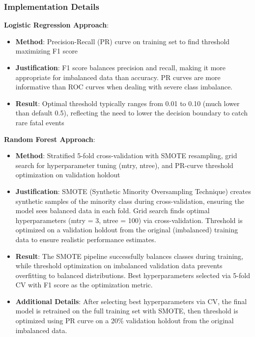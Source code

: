 \documentclass[12pt,a4paper]{article}
\begin{document}
\subsubsection{Implementation Details}

\textbf{Logistic Regression Approach}:
\begin{itemize}
    \item \textbf{Method}: Precision-Recall (PR) curve on training set to find threshold maximizing F1 score
    \item \textbf{Justification}: F1 score balances precision and recall, making it more appropriate for imbalanced data than accuracy. PR curves are more informative than ROC curves when dealing with severe class imbalance.
    \item \textbf{Result}: Optimal threshold typically ranges from 0.01 to 0.10 (much lower than default 0.5), reflecting the need to lower the decision boundary to catch rare fatal events
\end{itemize}

\textbf{Random Forest Approach}:
\begin{itemize}
    \item \textbf{Method}: Stratified 5-fold cross-validation with SMOTE resampling, grid search for hyperparameter tuning (mtry, ntree), and PR-curve threshold optimization on validation holdout
    \item \textbf{Justification}: SMOTE (Synthetic Minority Oversampling Technique) creates synthetic samples of the minority class during cross-validation, ensuring the model sees balanced data in each fold. Grid search finds optimal hyperparameters (mtry = 3, ntree = 100) via cross-validation. Threshold is optimized on a validation holdout from the original (imbalanced) training data to ensure realistic performance estimates.
    \item \textbf{Result}: The SMOTE pipeline successfully balances classes during training, while threshold optimization on imbalanced validation data prevents overfitting to balanced distributions. Best hyperparameters selected via 5-fold CV with F1 score as the optimization metric.
    \item \textbf{Additional Details}: After selecting best hyperparameters via CV, the final model is retrained on the full training set with SMOTE, then threshold is optimized using PR curve on a 20\% validation holdout from the original imbalanced data.
\end{itemize}
\end{document}
